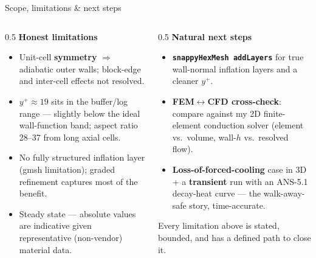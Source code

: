 \documentclass[aspectratio=169,11pt]{beamer}
\newcommand{\faBalanceScale}{\ding{47}}
\newcommand{\faArrowRight}{\ding{228}}
\newcommand{\kw}[1]{{\color{RadBlue}\bfseries #1}}
\begin{document}
\begin{frame}{Scope, limitations \& next steps}
\begin{columns}[T]
\begin{column}{0.5\textwidth}
\textbf{\color{RadNavy}\faBalanceScale\; Honest limitations}
\begin{itemize}\small
  \item Unit-cell \kw{symmetry} $\Rightarrow$ adiabatic outer walls; block-edge and inter-cell effects not resolved.
  \item $y^{+}\!\approx\!19$ sits in the buffer/log range --- slightly below the ideal wall-function band; aspect ratio 28--37 from long axial cells.
  \item No fully structured inflation layer (gmsh limitation); graded refinement captures most of the benefit.
  \item Steady state --- absolute values are indicative given representative (non-vendor) material data.
\end{itemize}
\end{column}
\begin{column}{0.5\textwidth}
\textbf{\color{RadNavy}\faArrowRight\; Natural next steps}
\begin{itemize}\small
  \item \kw{\texttt{snappyHexMesh addLayers}} for true wall-normal inflation layers and a cleaner $y^{+}$.
  \item \kw{FEM$\leftrightarrow$CFD cross-check}: compare against my 2D finite-element conduction solver (element vs.\ volume, wall-$h$ vs.\ resolved flow).
  \item \kw{Loss-of-forced-cooling} case in 3D + a \kw{transient} run with an ANS-5.1 decay-heat curve --- the walk-away-safe story, time-accurate.
\end{itemize}
\vspace{0.2cm}
{\color{RadGray}\footnotesize Every limitation above is stated, bounded, and has a defined path to close it.}
\end{column}
\end{columns}
\end{frame}
\end{document}
